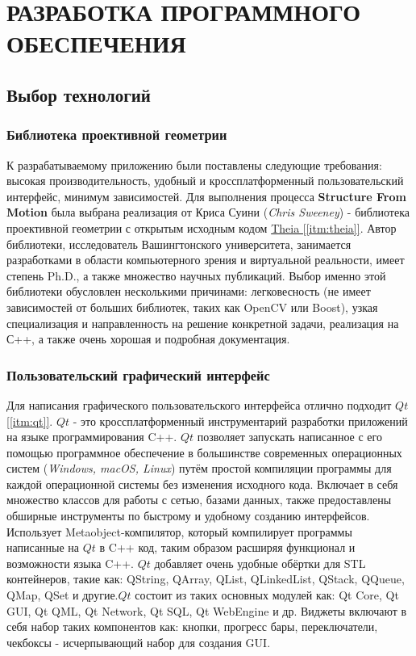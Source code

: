 \chapter{РАЗРАБОТКА ПРОГРАММНОГО ОБЕСПЕЧЕНИЯ}

\section{Выбор технологий}

\subsection{Библиотека проективной геометрии}
К разрабатываемому приложению были поставлены следующие требования: высокая производительность, удобный и кроссплатформенный пользовательский интерфейс, минимум зависимостей. Для выполнения процесса \textbf{Structure From Motion} была выбрана реализация от Криса Суини (\textit{Chris Sweeney}) - библиотека проективной геометрии с открытым исходным кодом \hyperref[itm:theia]{Theia [\ref{itm:theia}]}. Автор библиотеки, исследователь Вашингтонского университета, занимается разработками в области компьютерного зрения и виртуальной реальности, имеет степень Ph.D., а также множество научных публикаций. Выбор именно этой библиотеки обусловлен несколькими причинами: легковесность (не имеет зависимостей от больших библиотек, таких как OpenCV или Boost), узкая специализация и направленность на решение конкретной задачи, реализация на С++, а также очень хорошая и подробная документация.

\subsection{Пользовательский графический интерфейс}
Для написания графического пользовательского интерфейса отлично подходит \hyperref[itm:qt]{$Qt$ [\ref{itm:qt}]}. $Qt$ - это кроссплатформенный инструментарий разработки приложений на языке программирования C++. $Qt$ позволяет запускать написанное с его помощью программное обеспечение в большинстве современных операционных систем (\textit{Windows, macOS, Linux}) путём простой компиляции программы для каждой операционной системы без изменения исходного кода. Включает в себя множество классов для работы с сетью, базами данных, также предоставлены обширные инструменты по быстрому и удобному созданию интерфейсов. Использует Metaobject-компилятор, который компилирует программы написанные на $Qt$ в C++ код, таким образом расширяя функционал и возможности языка C++. $Qt$ добавляет очень удобные обёртки для STL контейнеров, такие как: QString, QArray, QList, QLinkedList, QStack, QQueue, QMap, QSet и другие.$Qt$ состоит из таких основных модулей как: Qt Core, Qt GUI, Qt QML, Qt Network, Qt SQL, Qt WebEngine и др. Виджеты включают в себя набор таких компонентов как: кнопки, прогресс бары, переключатели, чекбоксы - исчерпывающий набор для создания GUI.

